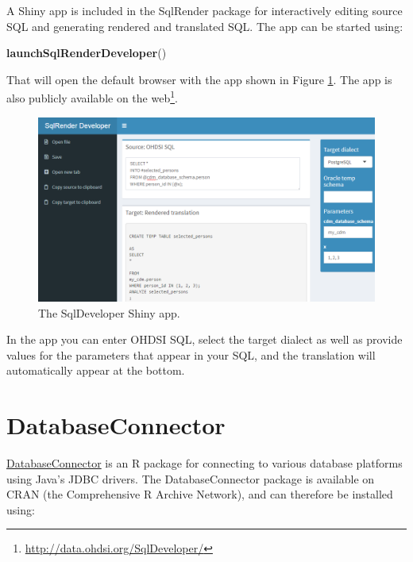 \documentclass[11pt]{book}
\newenvironment{Shaded}{\begin{snugshade}}{\end{snugshade}}
\newcommand{\KeywordTok}[1]{\textcolor[rgb]{0.13,0.29,0.53}{\textbf{#1}}}
\newcommand{\NormalTok}[1]{#1}
\let\rmarkdownfootnote\footnote%
\def\footnote{\protect\rmarkdownfootnote}
\theoremstyle{definition}
\theoremstyle{definition}
\theoremstyle{definition}
\theoremstyle{remark}
\begin{document}
A Shiny app is included in the SqlRender package for interactively editing source SQL and generating rendered and translated SQL. The app can be started using:

\begin{Shaded}
\begin{Highlighting}[]
\KeywordTok{launchSqlRenderDeveloper}\NormalTok{()}
\end{Highlighting}
\end{Shaded}

That will open the default browser with the app shown in Figure \ref{fig:sqlDeveloper}. The app is also publicly available on the web\footnote{\url{http://data.ohdsi.org/SqlDeveloper/}}.

\begin{figure}

{\centering \includegraphics[width=1\linewidth]{images/SqlAndR/sqlDeveloper} 

}

\caption{The SqlDeveloper Shiny app.}\label{fig:sqlDeveloper}
\end{figure}

In the app you can enter OHDSI SQL, select the target dialect as well as provide values for the parameters that appear in your SQL, and the translation will automatically appear at the bottom.

\hypertarget{DatabaseConnector}{%
\section{DatabaseConnector}\label{DatabaseConnector}}

\href{https://ohdsi.github.io/DatabaseConnector/}{DatabaseConnector} is an R package for connecting to various database platforms using Java's JDBC drivers. The DatabaseConnector package is available on CRAN (the Comprehensive R Archive Network), and can therefore be installed using:
\end{document}
